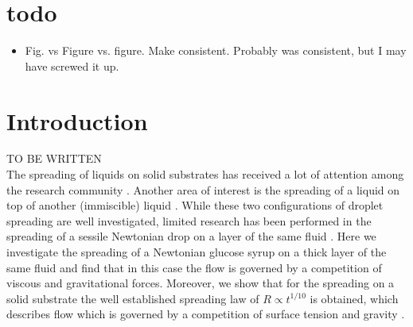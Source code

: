 \documentclass[aip,graphicx]{revtex4-1}
\begin{document}
\pacs{}%

\maketitle %





\section{todo}
\begin{itemize}
\item Fig. vs Figure vs. figure. Make consistent. Probably was 
consistent, but I may have screwed it up.
\end{itemize}

\section{Introduction}
\label{sec:introduction}

\noindent TO BE WRITTEN\\ The spreading of liquids on solid substrates
has received a lot of attention among the research community
\cite{de1985wetting, bonn2009wetting}.  Another area of interest is
the spreading of a liquid on top of another (immiscible) liquid
\cite{fraaije1989dynamics, joos1977spreading}.  While these two
configurations of droplet spreading are well investigated, limited
research has been performed in the spreading of a sessile Newtonian
drop on a layer of the same fluid \cite{tanner1979spreading,
  cormier2012beyond, chebbi1999capillary}.  Here we investigate the
spreading of a Newtonian glucose syrup on a thick layer of the same
fluid and find that in this case the flow is governed by a competition
of viscous and gravitational forces.  Moreover, we show that for the
spreading on a solid substrate the well established spreading law of
$R \propto t^{1/10}$ is obtained, which describes flow which is
governed by a competition of surface tension and gravity
\cite{bonn2009wetting}.
\end{document}

